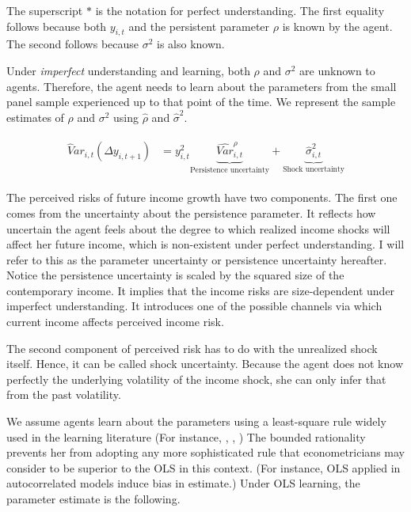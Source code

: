 \documentclass[12pt,notitlepage,onecolumn,aps,pra]{article}
\begin{document}
The superscript \(*\) is the notation for perfect understanding. The
first equality follows because both \(y_{i,t}\) and the persistent
parameter \(\rho\) is known by the agent. The second follows because
\(\sigma^2\) is also known.

Under \emph{imperfect} understanding and learning, both \(\rho\) and
\(\sigma^2\) are unknown to agents. Therefore, the agent needs to learn
about the parameters from the small panel sample experienced up to that
point of the time. We represent the sample estimates of \(\rho\) and
\(\sigma^2\) using \(\widehat \rho\) and \(\hat{\sigma}^2\).

\begin{eqnarray}
\begin{split}
\widehat Var_{i,t}(\Delta y_{i,t+1}) & = y_{i,t}^2 \underbrace{\widehat{Var}^{\rho}_{i,t}}_{\text{Persistence uncertainty}} + \underbrace{\hat{\sigma}^2_{i,t}}_{\text{Shock uncertainty}}
\end{split}
\end{eqnarray}

The perceived risks of future income growth have two components. The
first one comes from the uncertainty about the persistence parameter. It
reflects how uncertain the agent feels about the degree to which
realized income shocks will affect her future income, which is
non-existent under perfect understanding. I will refer to this as the
parameter uncertainty or persistence uncertainty hereafter. Notice the
persistence uncertainty is scaled by the squared size of the
contemporary income. It implies that the income risks are size-dependent
under imperfect understanding. It introduces one of the possible
channels via which current income affects perceived income risk.

The second component of perceived risk has to do with the unrealized
shock itself. Hence, it can be called shock uncertainty. Because the
agent does not know perfectly the underlying volatility of the income
shock, she can only infer that from the past volatility.

We assume agents learn about the parameters using a least-square rule
widely used in the learning literature (For instance,
\cite{marcet1989convergence}, \cite{evans2012learning},
\cite{malmendier2015learning}) The bounded rationality prevents her from
adopting any more sophisticated rule that econometricians may consider
to be superior to the OLS in this context. (For instance, OLS applied in
autocorrelated models induce bias in estimate.) Under OLS learning, the
parameter estimate is the following.
\end{document}

